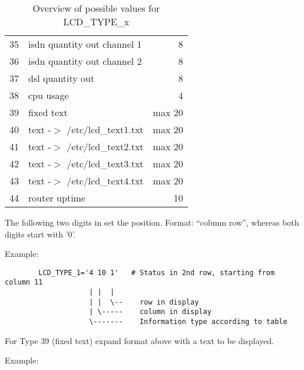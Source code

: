 \begin{description}
\begin{table}[htbp]
\begin{small}
\begin{center}
\begin{tabular}{rlr}
                35 &      isdn quantity out channel 1     &  8 \\
                36 &      isdn quantity out channel 2     &  8 \\
                37 &      dsl quantity out                &  8 \\

                38 &      cpu usage                       &  4 \\

                39 &      fixed text                  & max 20 \\
                40 &      text -$>$ /etc/lcd\_text1.txt  & max 20 \\
                41 &      text -$>$ /etc/lcd\_text2.txt  & max 20 \\
                42 &      text -$>$ /etc/lcd\_text3.txt  & max 20 \\
                43 &      text -$>$ /etc/lcd\_text4.txt  & max 20 \\

                44 &      router uptime                   & 10 \\

            \end{tabular}
            \caption{Overview of possible values for LCD\_TYPE\_x}
          \end{center}
          \end{small}
        \end{table}




        The following two digits in  set the position.
        Format: ``column row'', whereas both digits start with '0'.

      Example:

\begin{example}
\begin{verbatim}
        LCD_TYPE_1='4 10 1'   # Status in 2nd row, starting from column 11
                    | |  |
                    | |  \--    row in display 
                    | \-----    column in display
                    \-------    Information type according to table
\end{verbatim}
\end{example}


        For Type 39 (fixed text) expand format above with a text to be 
        displayed.

      Example:


\end{description}
